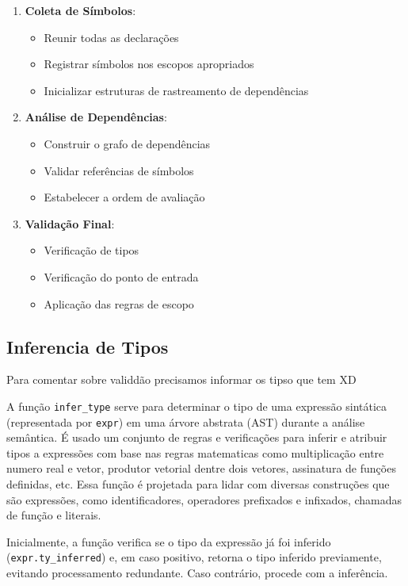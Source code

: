 \begin{enumerate}
    \item \textbf{Coleta de Símbolos}:
    \begin{itemize}
        \item Reunir todas as declarações
        \item Registrar símbolos nos escopos apropriados
        \item Inicializar estruturas de rastreamento de dependências
    \end{itemize}

    \item \textbf{Análise de Dependências}:
    \begin{itemize}
        \item Construir o grafo de dependências
        \item Validar referências de símbolos
        \item Estabelecer a ordem de avaliação
    \end{itemize}

    \item \textbf{Validação Final}:
    \begin{itemize}
        \item Verificação de tipos
        \item Verificação do ponto de entrada
        \item Aplicação das regras de escopo
    \end{itemize}
\end{enumerate}



\subsection{Inferencia de Tipos}
Para comentar sobre validdão precisamos informar os tipso que tem XD


A função \verb`infer_type` serve para determinar o tipo de uma expressão sintática (representada por \verb`expr`) em uma árvore abstrata (AST) durante a análise semântica. É usado um conjunto de regras e verificações para inferir e atribuir tipos a expressões com base nas regras matematicas como multiplicação entre numero real e vetor, produtor vetorial dentre dois vetores, assinatura de funções definidas, etc.  Essa função é projetada para lidar com diversas construções que são expressões, como identificadores, operadores prefixados e infixados, chamadas de função e literais.


Inicialmente, a função verifica se o tipo da expressão já foi inferido (\verb`expr.ty_inferred`) e, em caso positivo, retorna o tipo inferido previamente, evitando processamento redundante. Caso contrário, procede com a inferência.

